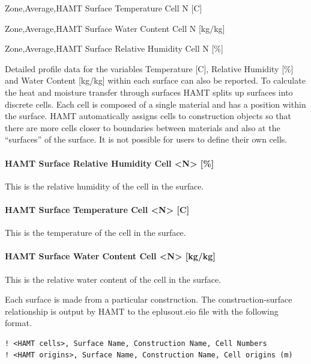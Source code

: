 Zone,Average,HAMT Surface Temperature Cell N {[}C{]}

Zone,Average,HAMT Surface Water Content Cell N {[}kg/kg{]}

Zone,Average,HAMT Surface Relative Humidity Cell N {[}\%{]}

Detailed profile data for the variables Temperature {[}C{]}, Relative Humidity {[}\%{]} and Water Content {[}kg/kg{]} within each surface can also be reported. To calculate the heat and moisture transfer through surfaces HAMT splits up surfaces into discrete cells. Each cell is composed of a single material and has a position within the surface. HAMT automatically assigns cells to construction objects so that there are more cells closer to boundaries between materials and also at the ``surfaces'' of the surface. It is not possible for users to define their own cells.

\paragraph{HAMT Surface Relative Humidity Cell \textless{}N\textgreater{} {[}\%{]}}\label{hamt-surface-relative-humidity-cell-n}

This is the relative humidity of the cell in the surface.

\paragraph{HAMT Surface Temperature Cell \textless{}N\textgreater{} {[}C{]}}\label{hamt-surface-temperature-cell-n-c}

This is the temperature of the cell in the surface.

\paragraph{HAMT Surface Water Content Cell \textless{}N\textgreater{} {[}kg/kg{]}}\label{hamt-surface-water-content-cell-n-kgkg}

This is the relative water content of the cell in the surface.

Each surface is made from a particular construction. The construction-surface relationship is output by HAMT to the eplusout.eio file with the following format.

\begin{lstlisting}
! <HAMT cells>, Surface Name, Construction Name, Cell Numbers
! <HAMT origins>, Surface Name, Construction Name, Cell origins (m)
\end{lstlisting}

